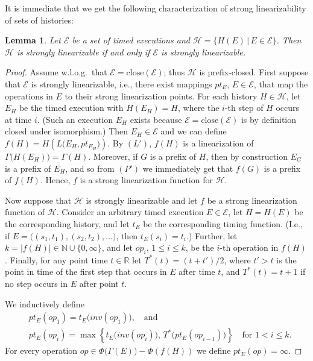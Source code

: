 \documentclass[11pt,letterpaper]{article}
\newtheorem{lemma}[theorem]{Lemma}
\newcommand{\EE}{\mathcal{E}}
\newcommand{\HH}{\mathcal{H}}
\newcommand{\close}[1]{\ensuremath{\text{close}\left(#1\right)}}
\begin{document}
It is immediate that we get the following characterization of strong linearizability of sets of histories:
\begin{lemma}\label{lem:strong-linearizability-linearization-points}
  Let $\EE$ be a set of timed executions and $\HH=\bigl\{H(E)\,|\,E\in\EE\bigr\}$.
  Then $\HH$ is strongly linearizable if and only if $\EE$ is strongly linearizable.
\end{lemma}
\begin{proof}
  Assume w.l.o.g.\ that $\EE=\close{\EE}$; thus $\HH$ is prefix-closed.
  First suppose that $\EE$ is strongly linearizable, i.e., there exist mappings $pt_E$, $E\in\EE$, that map the operations in $E$ to their strong linearization points.
  For each history $H\in\HH$, let $E_H$ be the timed execution with $H(E_H)=H$, where the $i$-th step of $H$ occurs at time $i$.
  (Such an execution $E_H$ exists because $\EE=\close{\EE}$ is by definition closed under isomorphism.)
  Then $E_H\in\EE$ and we can define $f(H)=H\left(L\bigl(E_H,pt_{E_H}\bigr)\right)$.
  By $(L')$, $f(H)$ is a linearization of $\Gamma\bigl(H(E_H)\bigr)=\Gamma(H)$.
  Moreover, if $G$ is a prefix of $H$, then by construction $E_G$ is a prefix of $E_H$, and so from $(P')$ we immediately get that $f(G)$ is a prefix of $f(H)$.
  Hence, $f$ is a strong linearization function for $\HH$.

  Now suppose that $\HH$ is strongly linearizable and let $f$ be a strong linearization function of $\HH$.
  Consider an arbitrary timed execution $E\in\EE$, let $H=H(E)$ be the corresponding history, and let $t_E$ be the corresponding timing function.
  (I.e., if $E=\bigl((s_1,t_1),(s_2,t_2),\dots\bigr)$, then $t_E(s_i)=t_i$.)
  Further, let $k=|f(H)|\in\mathds{N}\cup\{0,\infty\}$, and let $op_i$, $1\leq i\leq k$, be the $i$-th operation in $f(H)$.
  Finally, for any point time $t\in\mathds{R}$ let $T^\ast(t)=(t+t')/2$, where $t'>t$ is the point in time of the first step that occurs in $E$ after time $t$, and $T^\ast(t)=t+1$ if no step occurs in $E$ after point $t$.

  We inductively define
  \begin{align*}
    & pt_{E}(op_1)=t_E\bigl(inv(op_1)\bigr),\quad\text{and}\\
    & pt_{E}(op_{i})=\max\left\{t_E\bigl(inv(op_i)\bigr),\,T^\ast\bigl(pt_{E}(op_{i-1})\bigr)\right\}\quad\text{for $1<i\leq k$.}
  \end{align*}
  For every operation $op\in \Phi\bigl(\Gamma(E)\bigr)-\Phi(f(H))$ we define $pt_E(op)=\infty$.


\end{proof}
\end{document}
